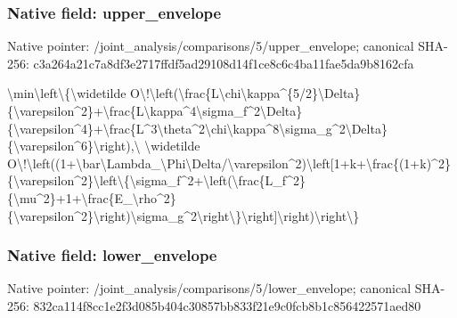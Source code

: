 \documentclass[10pt,a4paper]{article}
\begin{document}
\subsubsection{Native field: upper\_envelope}


Native pointer: /joint\_analysis/comparis\allowbreak{}ons/5/upper\_envelope; canonical SHA-256: c3a264a21c7a8df3e2717ffd\allowbreak{}f5ad29108d14f1ce8c6c4ba1\allowbreak{}1fae5da9b8162cfa


\textbackslash{}min\textbackslash{}left\textbackslash{}\{\textbackslash{}widetilde O\textbackslash{}!\textbackslash{}left(\textbackslash{}frac\{L\textbackslash{}chi\textbackslash{}kap\allowbreak{}pa\textasciicircum{}\{5/2\}\textbackslash{}Delta\}\{\textbackslash{}varepsi\allowbreak{}lon\textasciicircum{}2\}+\textbackslash{}frac\{L\textbackslash{}kappa\textasciicircum{}4\textbackslash{}s\allowbreak{}igma\_f\textasciicircum{}2\textbackslash{}Delta\}\{\textbackslash{}varepsi\allowbreak{}lon\textasciicircum{}4\}+\textbackslash{}frac\{L\textasciicircum{}3\textbackslash{}theta\textasciicircum{}2\allowbreak{}\textbackslash{}chi\textbackslash{}kappa\textasciicircum{}8\textbackslash{}sigma\_g\textasciicircum{}2\textbackslash{}D\allowbreak{}elta\}\{\textbackslash{}varepsilon\textasciicircum{}6\}\textbackslash{}rig\allowbreak{}ht),\textbackslash{} \textbackslash{}widetilde O\textbackslash{}!\textbackslash{}left((1+\textbackslash{}bar\textbackslash{}Lambda\_\allowbreak{}\textbackslash{}Phi\textbackslash{}Delta/\textbackslash{}varepsilon\textasciicircum{}2\allowbreak{})\textbackslash{}left[1+k+\textbackslash{}frac\{(1+k)\textasciicircum{}2\allowbreak{}\}\{\textbackslash{}varepsilon\textasciicircum{}2\}\textbackslash{}left\textbackslash{}\{\textbackslash{}\allowbreak{}sigma\_f\textasciicircum{}2+\textbackslash{}left(\textbackslash{}frac\{L\_\allowbreak{}f\textasciicircum{}2\}\{\textbackslash{}mu\textasciicircum{}2\}+1+\textbackslash{}frac\{E\_\textbackslash{}r\allowbreak{}ho\textasciicircum{}2\}\{\textbackslash{}varepsilon\textasciicircum{}2\}\textbackslash{}rig\allowbreak{}ht)\textbackslash{}sigma\_g\textasciicircum{}2\textbackslash{}right\textbackslash{}\}\textbackslash{}ri\allowbreak{}ght]\textbackslash{}right)\textbackslash{}right\textbackslash{}\}


\subsubsection{Native field: lower\_envelope}


Native pointer: /joint\_analysis/comparis\allowbreak{}ons/5/lower\_envelope; canonical SHA-256: 832ca114f8cc1e2f3d085b40\allowbreak{}4c30857bb833f21e9c0fcb8b\allowbreak{}1c856422571aed80
\end{document}

